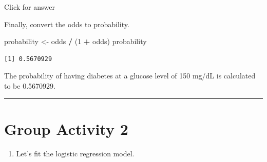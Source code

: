 \documentclass[
]{book}
\newenvironment{Shaded}{\begin{snugshade}}{\end{snugshade}}
\newcommand{\DecValTok}[1]{\textcolor[rgb]{0.00,0.00,0.81}{#1}}
\newcommand{\NormalTok}[1]{#1}
\newcommand{\OtherTok}[1]{\textcolor[rgb]{0.56,0.35,0.01}{#1}}
\newcommand{\SpecialCharTok}[1]{\textcolor[rgb]{0.81,0.36,0.00}{\textbf{#1}}}
\providecommand{\tightlist}{%
  \setlength{\itemsep}{0pt}\setlength{\parskip}{0pt}}
\begin{document}
Click for answer

Finally, convert the odds to probability.

\begin{Shaded}
\begin{Highlighting}[]
\NormalTok{probability }\OtherTok{\textless{}{-}}\NormalTok{ odds }\SpecialCharTok{/}\NormalTok{ (}\DecValTok{1} \SpecialCharTok{+}\NormalTok{ odds)}
\NormalTok{probability}
\end{Highlighting}
\end{Shaded}

\begin{verbatim}
[1] 0.5670929
\end{verbatim}

The probability of having diabetes at a glucose level of 150 mg/dL is calculated to be 0.5670929.

\begin{center}\rule{0.5\linewidth}{0.5pt}\end{center}

\hypertarget{group-activity-2-8}{%
\section{Group Activity 2}\label{group-activity-2-8}}

\begin{enumerate}
\def\labelenumi{\alph{enumi}.}
\tightlist
\item
  Let's fit the logistic regression model.
\end{enumerate}
\end{document}
